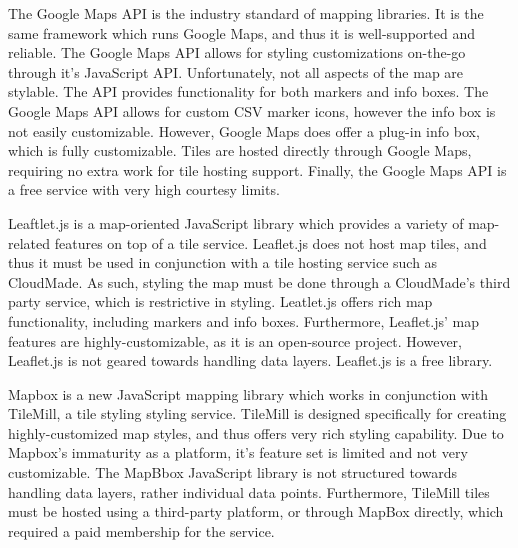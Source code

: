 \documentclass{report}
\begin{document}
The Google Maps API is the industry standard of mapping libraries. It is the same framework which runs Google Maps, and thus it is well-supported and reliable. The Google Maps API allows for styling customizations on-the-go through it's JavaScript API. Unfortunately, not all aspects of the map are stylable. The API provides functionality for both markers and info boxes. The Google Maps API allows for custom CSV marker icons, however the info box is not easily customizable. However, Google Maps does offer a plug-in info box, which is fully customizable. Tiles are hosted directly through Google Maps, requiring no extra work for tile hosting support. Finally, the Google Maps API is a free service with very high courtesy limits.

Leaftlet.js is a map-oriented JavaScript library which provides a variety of map-related features on top of a tile service. Leaflet.js does not host map tiles, and thus it must be used in conjunction with a tile hosting service such as CloudMade. As such, styling the map must be done through a CloudMade's third party service, which is restrictive in styling. Leatlet.js offers rich map functionality, including markers and info boxes. Furthermore, Leaflet.js' map features are highly-customizable, as it is an open-source project. However, Leaflet.js is not geared towards handling data layers. Leaflet.js is a free library.

Mapbox is a new JavaScript mapping library which works in conjunction with TileMill, a tile styling styling service. TileMill is designed specifically for creating highly-customized map styles, and thus offers very rich styling capability. Due to Mapbox's immaturity as a platform, it's feature set is limited and not very customizable. The MapBbox JavaScript library is not structured towards handling data layers, rather individual data points. Furthermore, TileMill tiles must be hosted using a third-party platform, or through MapBox directly, which required a paid membership for the service.
\end{document}
